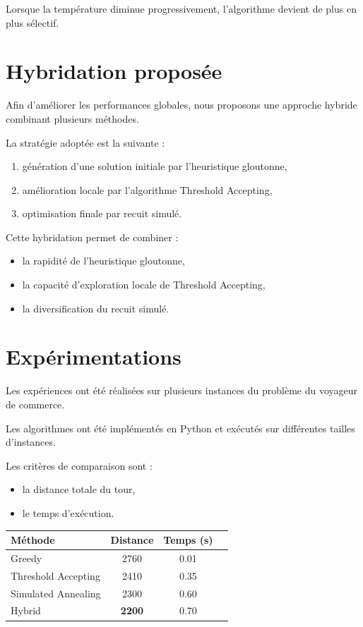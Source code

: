 \documentclass[11pt,a4paper]{article}
\begin{document}
Lorsque la température diminue progressivement,
l’algorithme devient de plus en plus sélectif.

\section{Hybridation proposée}

Afin d’améliorer les performances globales,
nous proposons une approche hybride combinant plusieurs méthodes.

La stratégie adoptée est la suivante :

\begin{enumerate}
\item génération d’une solution initiale par l’heuristique gloutonne,
\item amélioration locale par l’algorithme Threshold Accepting,
\item optimisation finale par recuit simulé.
\end{enumerate}

Cette hybridation permet de combiner :

\begin{itemize}
\item la rapidité de l’heuristique gloutonne,
\item la capacité d’exploration locale de Threshold Accepting,
\item la diversification du recuit simulé.
\end{itemize}

\section{Expérimentations}

Les expériences ont été réalisées sur plusieurs instances
du problème du voyageur de commerce.

Les algorithmes ont été implémentés en Python
et exécutés sur différentes tailles d’instances.

Les critères de comparaison sont :

\begin{itemize}
\item la distance totale du tour,
\item le temps d’exécution.
\end{itemize}

\begin{center}
\begin{tabular}{lccc}
\toprule
Méthode & Distance & Temps (s) \\
\midrule
Greedy & 2760 & 0.01 \\
Threshold Accepting & 2410 & 0.35 \\
Simulated Annealing & 2300 & 0.60 \\
Hybrid & \textbf{2200} & 0.70 \\
\bottomrule
\end{tabular}
\end{center}
\end{document}
